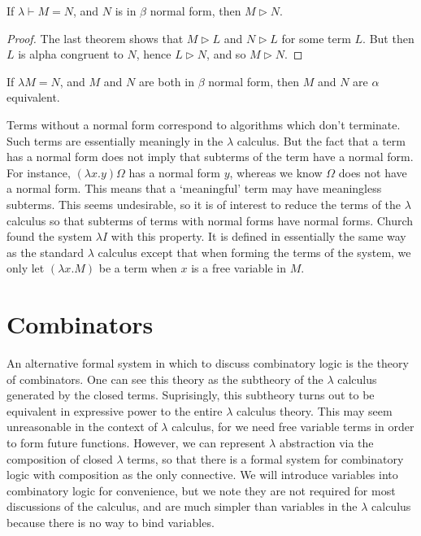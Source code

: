 \begin{corollary}
    If $\lambda \vdash M = N$, and $N$ is in $\beta$ normal form, then $M \rhd N$.
\end{corollary}
\begin{proof}
    The last theorem shows that $M \rhd L$ and $N \rhd L$ for some term $L$. But then $L$ is alpha congruent to $N$, hence $L \rhd N$, and so $M \rhd N$.
\end{proof}

\begin{corollary}
    If $\lambda M = N$, and $M$ and $N$ are both in $\beta$ normal form, then $M$ and $N$ are $\alpha$ equivalent.
\end{corollary}

Terms without a normal form correspond to algorithms which don't terminate. Such terms are essentially meaningly in the $\lambda$ calculus. But the fact that a term has a normal form does not imply that subterms of the term have a normal form. For instance, $(\lambda x.y)\Omega$ has a normal form $y$, whereas we know $\Omega$ does not have a normal form. This means that a `meaningful' term may have meaningless subterms. This seems undesirable, so it is of interest to reduce the terms of the $\lambda$ calculus so that subterms of terms with normal forms have normal forms. Church found the system $\lambda I$ with this property. It is defined in essentially the same way as the standard $\lambda$ calculus except that when forming the terms of the system, we only let $(\lambda x.M)$ be a term when $x$ is a free variable in $M$.



\section{Combinators}

An alternative formal system in which to discuss combinatory logic is the theory of combinators. One can see this theory as the subtheory of the $\lambda$ calculus generated by the closed terms. Suprisingly, this subtheory turns out to be equivalent in expressive power to the entire $\lambda$ calculus theory. This may seem unreasonable in the context of $\lambda$ calculus, for we need free variable terms in order to form future functions. However, we can represent $\lambda$ abstraction via the composition of closed $\lambda$ terms, so that there is a formal system for combinatory logic with composition as the only connective. We will introduce variables into combinatory logic for convenience, but we note they are not required for most discussions of the calculus, and are much simpler than variables in the $\lambda$ calculus because there is no way to bind variables.

